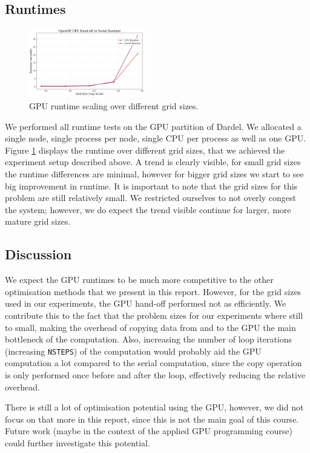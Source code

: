 \documentclass[a4paper,10pt]{article}
\begin{document}
\begin{multicols}{2}
\subsection{Runtimes}
\begin{figure}[H]
     \centering
     \includegraphics[width=0.45\textwidth]{../images/2_openmp/gpu_comparison.png}
     \caption{GPU runtime scaling over different grid sizes.}
     \label{fig:2_gpu_scaling}
\end{figure}
We performed all runtime tests on the GPU partition of Dardel.
We allocated a single node, single process per node, single CPU per process as well as one GPU.
Figure \ref{fig:2_gpu_scaling} displays the runtime over different grid sizes, that we achieved the experiment setup described above.
A trend is clearly visible, for small grid sizes the runtime differences are minimal, however for bigger grid sizes we start to see big improvement in runtime.
It is important to note that the grid sizes for this problem are still relatively small.
We restricted ourselves to not overly congest the system; however, we do expect the trend visible continue for larger, more mature grid sizes.

\subsection{Discussion}
We expect the GPU runtimes to be much more competitive to the other optimisation methods that we present in this report.
However, for the grid sizes used in our experiments, the GPU hand-off performed not as efficiently.
We contribute this to the fact that the problem sizes for our experiments where still to small, making the overhead of copying data from and to the GPU the main bottleneck of the computation.
Also, increasing the number of loop iterations (increasing \verb|NSTEPS|) of the computation would probably aid the GPU computation a lot compared to the serial computation, since the copy operation is only performed once before and after the loop, effectively reducing the relative overhead.

There is still a lot of optimisation potential using the GPU, however, we did not focus on that more in this report, since this is not the main goal of this course.
Future work (maybe in the context of the applied GPU programming course) could further investigate this potential.


\end{multicols}
\end{document}
